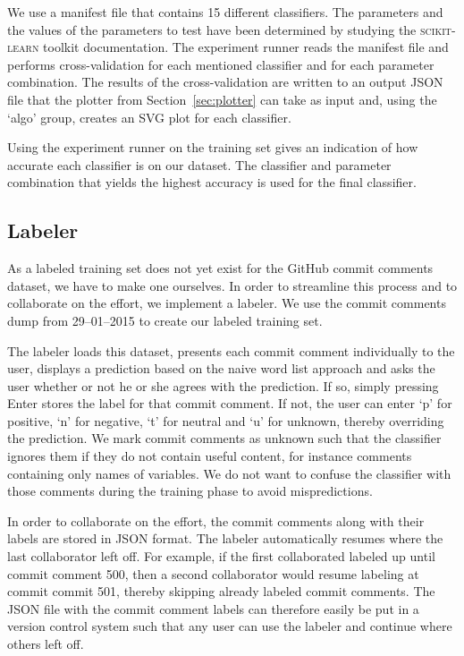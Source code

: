 \documentclass{article}
\begin{document}
We use a manifest file that contains 15 different classifiers. The
parameters and the values of the parameters to test have been determined by
studying the \textsc{scikit-learn} toolkit documentation. The experiment runner
reads the manifest file and performs cross-validation for each mentioned
classifier and for each parameter combination. The results of the
cross-validation are written to an output JSON file that the plotter from
Section~\ref{sec:plotter} can take as input and, using the `algo' group,
creates an SVG plot for each classifier.

Using the experiment runner on the training set gives an indication of
how accurate each classifier is on our dataset. The classifier and
parameter combination that yields the highest accuracy is used for the
final classifier.

\subsection{Labeler}\label{sec:labeler}
As a labeled training set does not yet exist for the GitHub commit comments
dataset, we have to make one ourselves. In order to streamline this process
and to collaborate on the effort, we implement a labeler. We use the commit
comments dump from 29--01--2015 to create our labeled training set.

The labeler loads this dataset, presents each commit comment individually to
the user, displays a prediction based on the naive word list approach and asks
the user whether or not he or she agrees with the prediction. If so, simply
pressing Enter stores the label for that commit comment. If not, the user
can enter `p' for positive, `n' for negative, `t' for neutral and `u' for
unknown, thereby overriding the prediction. We mark commit comments as unknown
such that the classifier ignores them if they do not contain useful content,
for instance comments containing only names of variables. We do not want to
confuse the classifier with those comments during the training phase to avoid
mispredictions.

In order to collaborate on the effort, the commit comments along with their
labels are stored in JSON format. The labeler automatically resumes where
the last collaborator left off. For example, if the first collaborated labeled
up until commit comment 500, then a second collaborator would resume labeling
at commit commit 501, thereby skipping already labeled commit comments. The
JSON file with the commit comment labels can therefore easily be put in a
version control system such that any user can use the labeler and continue 
where others left off.
\end{document}
